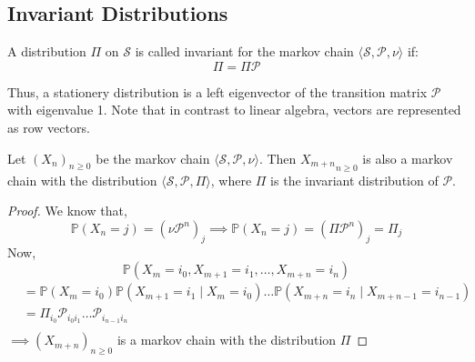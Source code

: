 \subsection{Invariant Distributions}
\begin{definition}
    A distribution \(\Pi\) on \(\mathcal{S}\) is called invariant for the markov chain \(\langle \mathcal{S} , \mathcal{P} , \nu \rangle\)
    if:
    \[
        \Pi = \Pi \mathcal{P}
    \]
\end{definition}
Thus, a stationery distribution is a left eigenvector of the transition matrix \(\mathcal{P}\) with eigenvalue 1.
Note that in contrast to linear algebra, vectors are represented as row vectors.
\begin{theorem}
    Let \({(X_n)}_{n \geq 0}\) be the markov chain \(\langle \mathcal{S} , \mathcal{P} , \nu \rangle\).
    Then \({X_{m+n} }_{n \geq 0}\) is also a markov chain with the distribution \(\langle \mathcal{S}
     , \mathcal{P} , \Pi \rangle\), where \(\Pi\) is the invariant distribution of \(\mathcal{P}\).
\end{theorem}
\begin{proof}
    We know that,
    \[
        \mathbb{P} (X_n = j) = {(\nu \mathcal{P}^n)}_j
        \implies \mathbb{P} (X_n = j) = {(\Pi \mathcal{P}^n)}_j = \Pi_j
    \]
    Now,
    \[
        \mathbb{P} (X_m = i_0, X_{m+1} = i_1, \dots , X_{m+n} = i_n)  
    \]
    \[
        \begin{aligned}
            & = \mathbb{P} (X_m = i_0) \mathbb{P} (X_{m+1} = i_1 \mid X_m = i_0) 
            \dots \mathbb{P} (X_{m+n} = i_n \mid X_{m+n-1} = i_{n-1}) \\
            & = \Pi_{i_0} \mathcal{P}_{i_0 i_1} \dots \mathcal{P}_{i_{n-1} i_n} \\
        \end{aligned}
    \]
    \(\implies \left( X_{m+n} \right)_{n \geq 0}\) is a markov chain with the distribution \(\Pi \)  
\end{proof}

